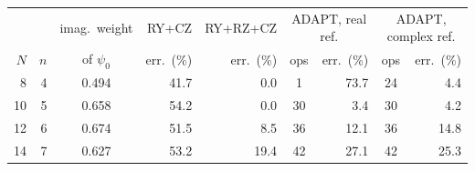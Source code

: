 \begin{tabular}{r r c r r c r c r}
\toprule
 & & imag.\ weight & RY+CZ & RY+RZ+CZ & \multicolumn{2}{c}{ADAPT, real ref.} & \multicolumn{2}{c}{ADAPT, complex ref.} \\
$N$ & $n$ & of $\psi_0$ & err.\ (\%) & err.\ (\%) & ops & err.\ (\%) & ops & err.\ (\%) \\
\midrule
8 & 4 & 0.494 & 41.7 & 0.0 & 1 & 73.7 & 24 & 4.4 \\
10 & 5 & 0.658 & 54.2 & 0.0 & 30 & 3.4 & 30 & 4.2 \\
12 & 6 & 0.674 & 51.5 & 8.5 & 36 & 12.1 & 36 & 14.8 \\
14 & 7 & 0.627 & 53.2 & 19.4 & 42 & 27.1 & 42 & 25.3 \\
\bottomrule
\end{tabular}
